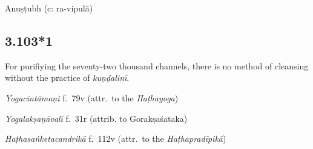 \begin{ekdosis}
\begin{philcomm}[hp03_103]
\end{philcomm}

\begin{metre}[hp03_103]
Anuṣṭubh (c: ra-vipulā)
\end{metre}

\subsection*{3.103*1}
\begin{translation}[hp03_103_1]
For purifiying the seventy-two thousand channels, there is no method of cleansing without the practice of \emph{kuṇḍalinī}.
\end{translation}

\begin{testimonia}[hp03_103_1]
\emph{Yogacintāmaṇi} f.~79v (attr.~to the \emph{Haṭhayoga})
\begin{versinnote}
\end{versinnote}

\emph{Yogalakṣaṇāvalī} f.~31r  (attrib. to Gorakṣaśataka)
\begin{versinnote}
\end{versinnote}


\emph{Haṭhasaṅketacandrikā} f.~112v (attr.~to the \emph{Haṭhapradīpikā})
\begin{versinnote}
\end{versinnote}
\end{testimonia}


\end{ekdosis}
